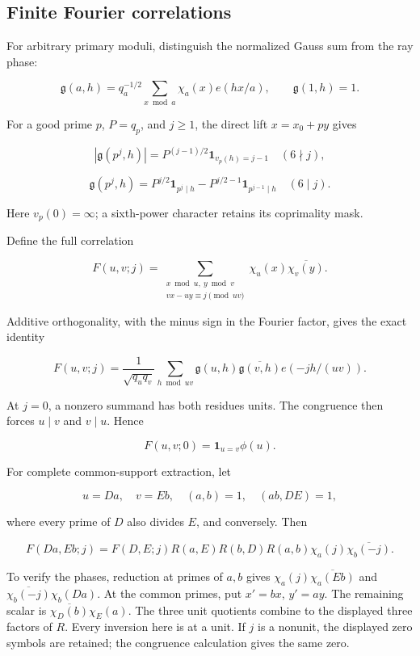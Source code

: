 \documentclass[11pt,a4paper]{article}
\begin{document}
\subsection{Finite Fourier correlations}\label{sec:A.4}

For arbitrary primary moduli, distinguish the normalized Gauss sum from the ray phase:

\[
\mathfrak g(a,h)=q_a^{-1/2}\sum_{x\bmod a}\chi_a(x)e(hx/a),\qquad \mathfrak g(1,h)=1.
\]

For a good prime \(p\), \(P=q_p\), and \(j\ge1\), the direct lift \(x=x_0+py\) gives

\[
|\mathfrak g(p^j,h)|=P^{(j-1)/2}\mathbf1_{v_p(h)=j-1}\quad(6\nmid j),
\]

\[
\mathfrak g(p^j,h)=P^{j/2}\mathbf1_{p^j\mid h}
 -P^{j/2-1}\mathbf1_{p^{j-1}\mid h}\quad(6\mid j).
\tag{A.12}\label{eq:A.12}
\]

Here \(v_p(0)=\infty\); a sixth-power character retains its coprimality mask.

Define the full correlation

\[
F(u,v;j)=\sum_{\substack{x\bmod u,\ y\bmod v\\vx-uy\equiv j\pmod{uv}}}
 \chi_u(x)\overline{\chi_v(y)}.
\tag{A.13}\label{eq:A.13}
\]

Additive orthogonality, with the minus sign in the Fourier factor, gives the exact identity

\[
F(u,v;j)=\frac1{\sqrt{q_uq_v}}
 \sum_{h\bmod uv}\mathfrak g(u,h)\overline{\mathfrak g(v,h)}e(-jh/(uv)).
\tag{A.14}\label{eq:A.14}
\]

At \(j=0\), a nonzero summand has both residues units. The congruence then forces \(u\mid v\) and \(v\mid u\). Hence

\[
F(u,v;0)=\mathbf1_{u=v}\phi(u).
\tag{A.15}\label{eq:A.15}
\]

For complete common-support extraction, let

\[
u=Da,\quad v=Eb,\quad (a,b)=1,\quad (ab,DE)=1,
\]

where every prime of \(D\) also divides \(E\), and conversely. Then

\[
F(Da,Eb;j)=F(D,E;j)R(a,E)R(b,D)R(a,b)
 \chi_a(j)\overline{\chi_b(-j)}.
\tag{A.16}\label{eq:A.16}
\]

To verify the phases, reduction at primes of \(a,b\) gives \(\chi_a(j)\overline{\chi_a(Eb)}\) and \(\overline{\chi_b(-j)}\chi_b(Da)\). At the common primes, put \(x'=bx\), \(y'=ay\). The remaining scalar is \(\overline{\chi_D(b)}\chi_E(a)\). The three unit quotients combine to the displayed three factors of \(R\). Every inversion here is at a unit. If \(j\) is a nonunit, the displayed zero symbols are retained; the congruence calculation gives the same zero.
\end{document}

